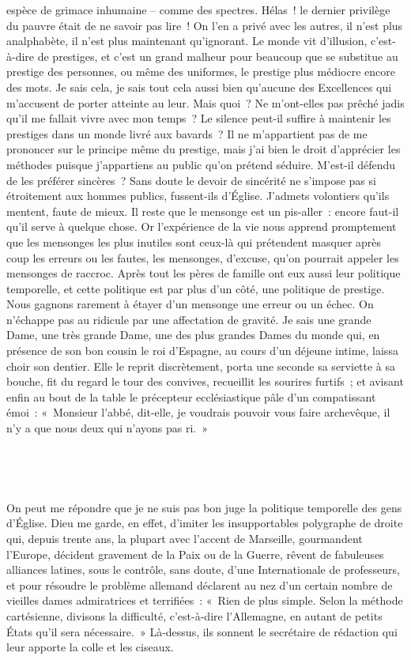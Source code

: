\documentclass[french,twoside]{book} %
\newcommand{\astertri}{\medskip\par\centerline{\color{rubric}\large\selectfont{\syms ✻\,✻\,✻}}\medskip\par}%
\begin{document}
espèce de grimace inhumaine – comme des spectres. Hélas ! le dernier privilège du pauvre était de ne savoir pas lire ! On l’en a privé avec les autres, il n’est plus analphabète, il n’est plus maintenant qu’ignorant. Le monde vit d’illusion, c’est-à-dire de prestiges, et c’est un grand malheur pour beaucoup que se substitue au prestige des personnes, ou même des uniformes, le prestige plus médiocre encore des mots. Je sais cela, je sais tout cela aussi bien qu’aucune des Excellences qui m’accusent de porter atteinte au leur. Mais quoi ? Ne m’ont-elles pas prêché jadis qu’il me fallait vivre avec mon temps ? Le silence peut-il suffire à maintenir les prestiges dans un monde livré aux bavards ? Il ne m’appartient pas de me prononcer sur le principe même du prestige, mais j’ai bien le droit d’apprécier les méthodes puisque j’appartiens au public qu’on prétend séduire. M’est-il défendu de les préférer sincères ? Sans doute le devoir de sincérité ne s’impose pas si étroitement aux hommes publics, fussent-ils d’Église. J’admets volontiers qu’ils mentent, faute de mieux. Il reste que le mensonge est un pis-aller : encore faut-il qu’il serve à quelque chose. Or l’expérience de la vie nous apprend promptement que les mensonges les plus inutiles sont ceux-là qui prétendent masquer après coup les erreurs ou les fautes, les mensonges, d’excuse, qu’on pourrait appeler les mensonges de raccroc. Après tout les pères de famille ont eux aussi leur politique temporelle, et cette politique est par plus d’un côté, une politique de prestige. Nous gagnons rarement à étayer d’un mensonge une erreur ou un échec. On n’échappe pas au ridicule par une affectation de gravité. Je sais une grande Dame, une très grande Dame, une des plus grandes Dames du monde qui, en présence de son bon cousin le roi d’Espagne, au cours d’un déjeune intime, laissa choir son dentier. Elle le reprit discrètement, porta une seconde sa serviette à sa bouche, fit du regard le tour des convives, recueillit les sourires furtifs ; et avisant enfin au bout de la table le précepteur ecclésiastique pâle d’un compatissant émoi : « Monsieur l’abbé, dit-elle, je voudrais pouvoir vous faire archevêque, il n’y a que nous deux qui n’ayons pas ri. »\par
 \par

\astertri

\noindent  \par
On peut me répondre que je ne suis pas bon juge la politique temporelle des gens d’Église. Dieu me garde, en effet, d’imiter les insupportables polygraphe de droite qui, depuis trente ans, la plupart avec l’accent de Marseille, gourmandent l’Europe, décident gravement de la Paix ou de la Guerre, rêvent de fabuleuses alliances latines, sous le contrôle, sans doute, d’une Internationale de professeurs, et pour résoudre le problème allemand déclarent au nez d’un certain nombre de vieilles dames admiratrices et terrifiées : « Rien de plus simple. Selon la méthode cartésienne, divisons la difficulté, c’est-à-dire l’Allemagne, en autant de petits États qu’il sera nécessaire. » Là-dessus, ils sonnent le secrétaire de rédaction qui leur apporte la colle et les ciseaux.\par
 \par
\end{document}
